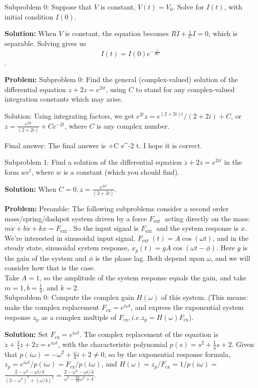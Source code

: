 \documentclass[10pt]{article}
\begin{document}
Subproblem 0: Suppose that $V$ is constant, $V(t)=V_{0}$. Solve for $I(t)$, with initial condition $I(0)$.


\textbf{Solution:}
When $V$ is constant, the equation becomes $R \dot{I}+\frac{1}{C} I=0$, which is separable. Solving gives us
\[
I(t)=\boxed{I(0) e^{-\frac{t}{R C}}
}\]. 


\textbf{Problem:}
Subproblem 0: Find the general (complex-valued) solution of the differential equation $\dot{z}+2 z=e^{2 i t}$, using $C$ to stand for any complex-valued integration constants which may arise.


Solution: Using integrating factors, we get $e^{2 t} z=e^{(2+2 i) t} /(2+2 i)+C$, or $z=\boxed{\frac{e^{2 i t}}{(2+2 i)}+C e^{-2 t}}$, where $C$ is any complex number.

Final answer: The final answer is +C e^{-2 t}. I hope it is correct.

Subproblem 1: Find a solution of the differential equation $\dot{z}+2 z=e^{2 i t}$ in the form $w e^{t}$, where $w$ is a constant (which you should find).


\textbf{Solution:}
When $C=0, z=\boxed{\frac{e^{2 i t}}{(2+2 i)}}$.


\textbf{Problem:}
Preamble: The following subproblems consider a second order mass/spring/dashpot system driven by a force $F_{\text {ext }}$ acting directly on the mass: $m \ddot{x}+b \dot{x}+k x=F_{\text {ext }}$. So the input signal is $F_{\text {ext }}$ and the system response is $x$. We're interested in sinusoidal input signal, $F_{\text {ext }}(t)=A \cos (\omega t)$, and in the steady state, sinusoidal system response, $x_{p}(t)=g A \cos (\omega t-\phi)$. Here $g$ is the gain of the system and $\phi$ is the phase lag. Both depend upon $\omega$, and we will consider how that is the case. \\
Take $A=1$, so the amplitude of the system response equals the gain, and take $m=1, b=\frac{1}{4}$, and $k=2$.\\

Subproblem 0: Compute the complex gain $H(\omega)$ of this system. (This means: make the complex replacement $F_{\mathrm{cx}}=e^{i \omega t}$, and express the exponential system response $z_{p}$ as a complex multiple of $F_{\mathrm{cx}}, i.e. z_{p}=H(\omega) F_{\mathrm{cx}}$).


\textbf{Solution:}
Set $F_{\mathrm{cx}}=e^{i \omega t}$. The complex replacement of the equation is $\ddot{z}+\frac{1}{4} \dot{z}+2 z=e^{i \omega t}$, with the characteristic polynomial $p(s)=s^{2}+\frac{1}{4} s+2.$ Given that $p(i \omega)=-\omega^{2}+\frac{\omega}{4} i+2 \neq 0$, so by the exponential response formula, $z_{p}=e^{i \omega t} / p(i \omega)=F_{\mathrm{cx}} / p(i \omega)$, and $H(\omega)=z_{p} / F_{\mathrm{cx}}=1 / p(i \omega)=$ $\frac{2-\omega^{2}-\omega i / 4}{\left(2-\omega^{2}\right)^{2}+(\omega / 4)^{2}}=\boxed{\frac{2-\omega^{2}-\omega i / 4}{\omega^{4}-\frac{63}{16} \omega^{2}+4}}$.
\end{document}

